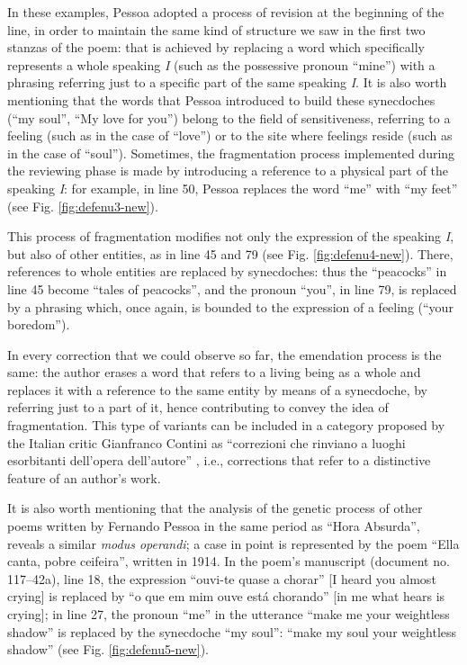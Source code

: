\documentclass{article}
\begin{document}
In these examples, Pessoa adopted a process of revision at the beginning of the line, in order to
maintain the same kind of structure we
saw in the first two stanzas of the poem: that is achieved by replacing
a word which specifically represents a whole speaking \emph{I} (such as
the possessive pronoun ``mine'') with a phrasing referring just to a
specific part of the same speaking \emph{I}. It is also worth mentioning
that the words that Pessoa introduced to build these synecdoches (``my
soul'', ``My love for you'') belong to the field of sensitiveness,
referring to a feeling (such as in the case of ``love'') or to the site
where feelings reside (such as in the case of ``soul''). Sometimes, the fragmentation process implemented during the reviewing
phase is made by introducing  a reference to a physical part
of the speaking \emph{I}: for example, in line 50, Pessoa replaces the
word ``me'' with ``my feet'' (see Fig. \ref{fig:defenu3-new}).

This process of fragmentation modifies not only the expression of the
speaking \emph{I}, but also of other entities, as in line 45
and 79 (see Fig. \ref{fig:defenu4-new}). There, references to whole entities are replaced by synecdoches: thus the
``peacocks'' in line 45 become ``tales of peacocks'', and the pronoun
``you'', in line 79, is replaced by a phrasing which, once again, is
bounded to the expression of a feeling (``your boredom'').

In every correction that we could observe so far, the emendation process
is the same: the author erases a word that refers to a living being as a
whole and replaces it with a reference to the same entity by means of a
synecdoche, by referring just to a part of it, hence contributing to
convey the idea of fragmentation. This type of variants can be included in a category proposed by the
Italian critic Gianfranco Contini as ``correzioni che rinviano a luoghi
esorbitanti dell'opera dell'autore'' \parencite[72]{contini_esercizi_1974}, i.e., corrections that
refer to a distinctive feature of an author's work.

It is also worth mentioning that the analysis of the genetic process of
other poems written by Fernando Pessoa in the same period as ``Hora
Absurda'', reveals a similar \emph{modus operandi}; a case in point is
represented by the poem ``Ella canta, pobre ceifeira'', written in 1914.
In the poem's manuscript (document no. 117--42a), line 18, the expression
``ouvi-te quase a chorar'' [I heard you almost crying] is replaced
by ``o que em mim ouve está chorando'' [in me what hears is crying];
in line 27, the pronoun ``me'' in the utterance ``make me your
weightless shadow'' is replaced by the synecdoche ``my soul'': ``make my
soul your weightless shadow'' (see Fig. \ref{fig:defenu5-new}).
\end{document}
